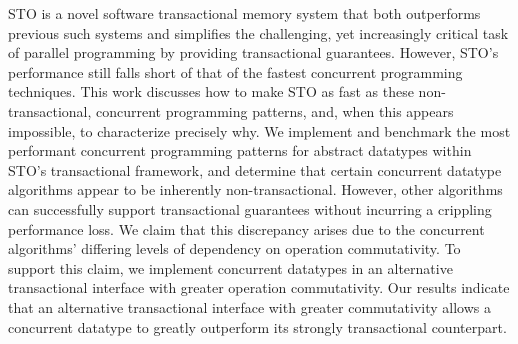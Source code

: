 STO is a novel software transactional memory system that both outperforms previous such systems and simplifies the challenging, yet increasingly critical task of parallel programming by providing transactional guarantees. 
However, STO's performance still falls short of that of the fastest concurrent programming techniques. This work discusses how to make STO as fast as these non-transactional, concurrent programming patterns, and, when this appears impossible, to characterize precisely why. 
We implement and benchmark the most performant concurrent programming patterns for abstract datatypes within STO's transactional framework, and determine that certain concurrent datatype algorithms appear to be inherently non-transactional. However, other algorithms can successfully support transactional guarantees without incurring a crippling performance loss. We claim that this discrepancy arises due to the concurrent algorithms' differing levels of dependency on operation commutativity. To support this claim, we implement concurrent datatypes in an alternative transactional interface with greater operation commutativity. Our results indicate that an alternative transactional interface with greater commutativity allows a concurrent datatype to greatly outperform its strongly transactional counterpart.
